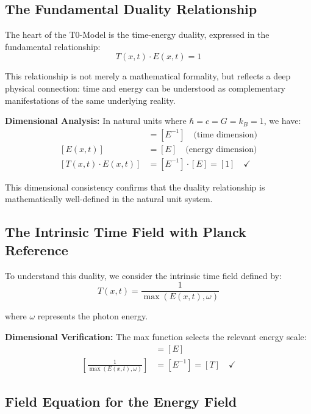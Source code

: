 \documentclass[12pt,a4paper]{report}
\newcommand{\natunits}{\hbar = c = G = k_B = 1} %
\begin{document}
	\subsection{The Fundamental Duality Relationship}\label{subsec:fundamental_duality}
	
	The heart of the T0-Model is the time-energy duality, expressed in the fundamental relationship:
	\begin{equation}
		\boxed{T(x,t) \cdot E(x,t) = 1}
		\label{eq:time_energy_duality}
	\end{equation}
	
	This relationship is not merely a mathematical formality, but reflects a deep physical connection: time and energy can be understood as complementary manifestations of the same underlying reality.
	
	\textbf{Dimensional Analysis:} In natural units where $\natunits$, we have:
	\begin{align}
		[T(x,t)] &= [E^{-1}] \quad \text{(time dimension)} \\
		[E(x,t)] &= [E] \quad \text{(energy dimension)} \\
		[T(x,t) \cdot E(x,t)] &= [E^{-1}] \cdot [E] = [1] \quad \checkmark
	\end{align}
	
	This dimensional consistency confirms that the duality relationship is mathematically well-defined in the natural unit system.
	
	\subsection{The Intrinsic Time Field with Planck Reference}\label{subsec:intrinsic_time_field}
	
	To understand this duality, we consider the intrinsic time field defined by:
	\begin{equation}
		T(x,t) = \frac{1}{\max(E(x,t), \omega)}
		\label{eq:intrinsic_time_field}
	\end{equation}
	
	where $\omega$ represents the photon energy.
	
	\textbf{Dimensional Verification:} The max function selects the relevant energy scale:
	\begin{align}
		[\max(E(x,t), \omega)] &= [E] \\
		\left[\frac{1}{\max(E(x,t), \omega)}\right] &= [E^{-1}] = [T] \quad \checkmark
	\end{align}
	
	\subsection{Field Equation for the Energy Field}\label{subsec:field_equation}
	
\end{document}
